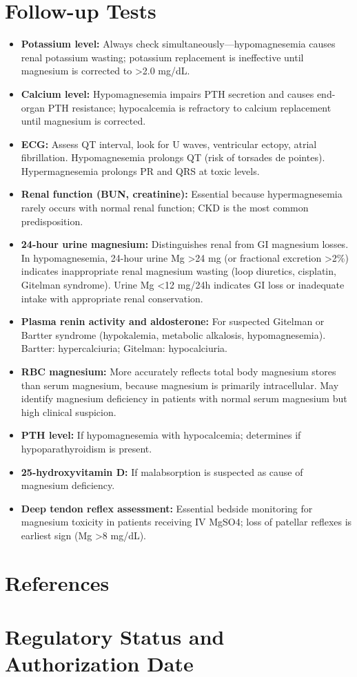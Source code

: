 \section*{Follow-up Tests}
\begin{itemize}
  \item \textbf{Potassium level:} Always check simultaneously---hypomagnesemia causes renal potassium wasting; potassium replacement is ineffective until magnesium is corrected to >2.0 mg/dL.
  \item \textbf{Calcium level:} Hypomagnesemia impairs PTH secretion and causes end-organ PTH resistance; hypocalcemia is refractory to calcium replacement until magnesium is corrected.
  \item \textbf{ECG:} Assess QT interval, look for U waves, ventricular ectopy, atrial fibrillation. Hypomagnesemia prolongs QT (risk of torsades de pointes). Hypermagnesemia prolongs PR and QRS at toxic levels.
  \item \textbf{Renal function (BUN, creatinine):} Essential because hypermagnesemia rarely occurs with normal renal function; CKD is the most common predisposition.
  \item \textbf{24-hour urine magnesium:} Distinguishes renal from GI magnesium losses. In hypomagnesemia, 24-hour urine Mg >24 mg (or fractional excretion >2\%) indicates inappropriate renal magnesium wasting (loop diuretics, cisplatin, Gitelman syndrome). Urine Mg <12 mg/24h indicates GI loss or inadequate intake with appropriate renal conservation.
  \item \textbf{Plasma renin activity and aldosterone:} For suspected Gitelman or Bartter syndrome (hypokalemia, metabolic alkalosis, hypomagnesemia). Bartter: hypercalciuria; Gitelman: hypocalciuria.
  \item \textbf{RBC magnesium:} More accurately reflects total body magnesium stores than serum magnesium, because magnesium is primarily intracellular. May identify magnesium deficiency in patients with normal serum magnesium but high clinical suspicion.
  \item \textbf{PTH level:} If hypomagnesemia with hypocalcemia; determines if hypoparathyroidism is present.
  \item \textbf{25-hydroxyvitamin D:} If malabsorption is suspected as cause of magnesium deficiency.
  \item \textbf{Deep tendon reflex assessment:} Essential bedside monitoring for magnesium toxicity in patients receiving IV MgSO4; loss of patellar reflexes is earliest sign (Mg >8 mg/dL).
\end{itemize}

\section*{References}



\clearpage
\section*{Regulatory Status and Authorization Date}

\clearpage
